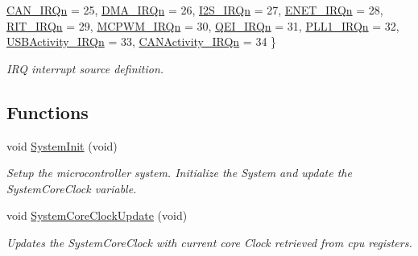 \begin{DoxyCompactItemize}
\hyperlink{group___l_p_c17xx___system_gga666eb0caeb12ec0e281415592ae89083a20d0bdfa1654b723493895e3ea617cdb}{\-C\-A\-N\-\_\-\-I\-R\-Qn} =  25, 
\hyperlink{group___l_p_c17xx___system_gga666eb0caeb12ec0e281415592ae89083a4968eb85558b7cd25e0f0fa1b839f881}{\-D\-M\-A\-\_\-\-I\-R\-Qn} =  26, 
\hyperlink{group___l_p_c17xx___system_gga666eb0caeb12ec0e281415592ae89083a133fe4eabad3ed7b1959daddaace94b3}{\-I2\-S\-\_\-\-I\-R\-Qn} =  27, 
\*
\hyperlink{group___l_p_c17xx___system_gga666eb0caeb12ec0e281415592ae89083af3a2a999d58e47ed39ed1bd9c877aee6}{\-E\-N\-E\-T\-\_\-\-I\-R\-Qn} =  28, 
\hyperlink{group___l_p_c17xx___system_gga666eb0caeb12ec0e281415592ae89083a075f80f900f31c166defe2a4aef99e77}{\-R\-I\-T\-\_\-\-I\-R\-Qn} =  29, 
\hyperlink{group___l_p_c17xx___system_gga666eb0caeb12ec0e281415592ae89083a66a11398b7cc13d7c525945b0a86a2f0}{\-M\-C\-P\-W\-M\-\_\-\-I\-R\-Qn} =  30, 
\hyperlink{group___l_p_c17xx___system_gga666eb0caeb12ec0e281415592ae89083a82471ba65527ad3f3da8af38acb953bf}{\-Q\-E\-I\-\_\-\-I\-R\-Qn} =  31, 
\*
\hyperlink{group___l_p_c17xx___system_gga666eb0caeb12ec0e281415592ae89083a0f0e46a33c20be148ef16fe7ed4dcd4b}{\-P\-L\-L1\-\_\-\-I\-R\-Qn} =  32, 
\hyperlink{group___l_p_c17xx___system_gga666eb0caeb12ec0e281415592ae89083aa3c495fabd97a50818dc748f738c71e7}{\-U\-S\-B\-Activity\-\_\-\-I\-R\-Qn} =  33, 
\hyperlink{group___l_p_c17xx___system_gga666eb0caeb12ec0e281415592ae89083a25ef61f3d4a0d5f2bcf0525702b872b7}{\-C\-A\-N\-Activity\-\_\-\-I\-R\-Qn} =  34
 \}
\begin{DoxyCompactList}\small\item\em \-I\-R\-Q interrupt source definition. \end{DoxyCompactList}\end{DoxyCompactItemize}
\subsection*{\-Functions}
\begin{DoxyCompactItemize}
\item 
void \hyperlink{group___l_p_c17xx___system_ga93f514700ccf00d08dbdcff7f1224eb2}{\-System\-Init} (void)
\begin{DoxyCompactList}\small\item\em \-Setup the microcontroller system. \-Initialize the \-System and update the \-System\-Core\-Clock variable. \end{DoxyCompactList}\item 
void \hyperlink{group___l_p_c17xx___system_gae0c36a9591fe6e9c45ecb21a794f0f0f}{\-System\-Core\-Clock\-Update} (void)
\begin{DoxyCompactList}\small\item\em \-Updates the \-System\-Core\-Clock with current core \-Clock retrieved from cpu registers. \end{DoxyCompactList}\end{DoxyCompactItemize}
